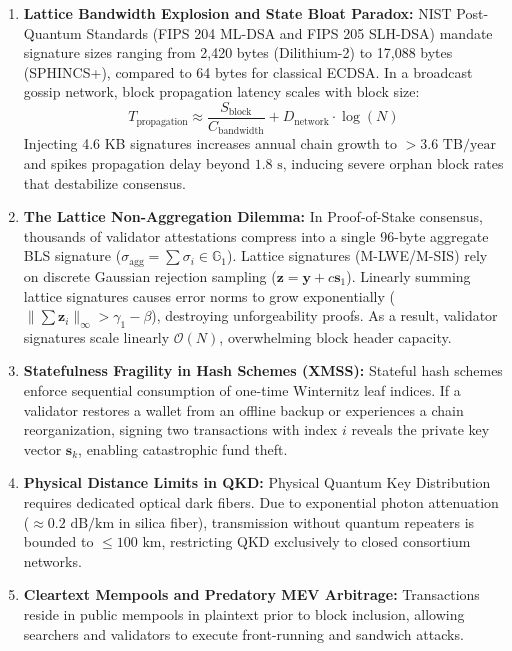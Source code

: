 \documentclass[runningheads]{llncs}
\begin{document}
\begin{enumerate}
    \item \textbf{Lattice Bandwidth Explosion and State Bloat Paradox:} NIST Post-Quantum Standards (FIPS 204 ML-DSA and FIPS 205 SLH-DSA) mandate signature sizes ranging from 2,420 bytes (Dilithium-2) to 17,088 bytes (SPHINCS+), compared to 64 bytes for classical ECDSA. In a broadcast gossip network, block propagation latency scales with block size:
    \begin{equation}
        T_{\text{propagation}} \approx \frac{S_{\text{block}}}{C_{\text{bandwidth}}} + D_{\text{network}} \cdot \log(N)
    \end{equation}
    Injecting 4.6 KB signatures increases annual chain growth to $> 3.6\text{ TB/year}$ and spikes propagation delay beyond $1.8\text{ s}$, inducing severe orphan block rates that destabilize consensus.
    
    \item \textbf{The Lattice Non-Aggregation Dilemma:} In Proof-of-Stake consensus, thousands of validator attestations compress into a single 96-byte aggregate BLS signature ($\sigma_{\text{agg}} = \sum \sigma_i \in \mathbb{G}_1$). Lattice signatures (M-LWE/M-SIS) rely on discrete Gaussian rejection sampling ($\mathbf{z} = \mathbf{y} + c\mathbf{s}_1$). Linearly summing lattice signatures causes error norms to grow exponentially ($\|\sum \mathbf{z}_i\|_\infty > \gamma_1 - \beta$), destroying unforgeability proofs. As a result, validator signatures scale linearly $\mathcal{O}(N)$, overwhelming block header capacity.
    
    \item \textbf{Statefulness Fragility in Hash Schemes (XMSS):} Stateful hash schemes enforce sequential consumption of one-time Winternitz leaf indices. If a validator restores a wallet from an offline backup or experiences a chain reorganization, signing two transactions with index $i$ reveals the private key vector $\mathbf{s}_k$, enabling catastrophic fund theft.
    
    \item \textbf{Physical Distance Limits in QKD:} Physical Quantum Key Distribution requires dedicated optical dark fibers. Due to exponential photon attenuation ($\approx 0.2\text{ dB/km}$ in silica fiber), transmission without quantum repeaters is bounded to $\le 100\text{ km}$, restricting QKD exclusively to closed consortium networks.
    
    \item \textbf{Cleartext Mempools and Predatory MEV Arbitrage:} Transactions reside in public mempools in plaintext prior to block inclusion, allowing searchers and validators to execute front-running and sandwich attacks.
\end{enumerate}
\end{document}
